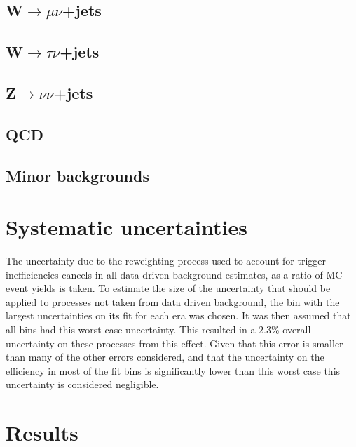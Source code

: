 \subsection{W$\rightarrow \mu\nu$+jets}%
\label{sec:parkedwmunu}

\subsection{W$\rightarrow \tau\nu$+jets}%
\label{sec:parkedwtaunu}

\subsection{Z$\rightarrow \nu\nu$+jets}%
\label{sec:parkedznunu}

\subsection{QCD}%
\label{sec:parkedQCD}

\subsection{Minor backgrounds}%
\label{sec:parkedminor}

\section{Systematic uncertainties}%
\label{sec:parkedsyst}
The uncertainty due to the reweighting process used to account for trigger inefficiencies cancels in all data driven background estimates, as a ratio of \ac{MC} event yields is taken. To estimate the size of the uncertainty that should be applied to processes not taken from data driven background, the bin with the largest uncertainties on its fit for each era was chosen. It was then assumed that all bins had this worst-case uncertainty. This resulted in a 2.3\% overall uncertainty on these processes from this effect. Given that this error is smaller than many of the other errors considered, and that the uncertainty on the efficiency in most of the fit bins is significantly lower than this worst case this uncertainty is considered negligible.



\section{Results}%
\label{sec:parkedresults}
